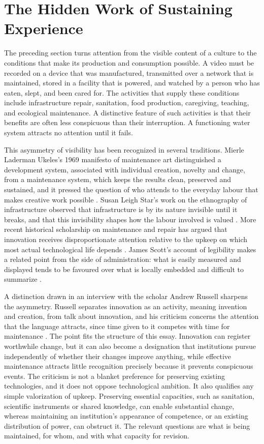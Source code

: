 \documentclass[11pt]{article}
\theoremstyle{definition}
\theoremstyle{remark}
\begin{document}
\section{The Hidden Work of Sustaining Experience}

The preceding section turns attention from the visible content of a culture to the conditions that make its production and consumption possible. A video must be recorded on a device that was manufactured, transmitted over a network that is maintained, stored in a facility that is powered, and watched by a person who has eaten, slept, and been cared for. The activities that supply these conditions include infrastructure repair, sanitation, food production, caregiving, teaching, and ecological maintenance. A distinctive feature of such activities is that their benefits are often less conspicuous than their interruption. A functioning water system attracts no attention until it fails.

This asymmetry of visibility has been recognized in several traditions. Mierle Laderman Ukeles's 1969 manifesto of maintenance art distinguished a development system, associated with individual creation, novelty and change, from a maintenance system, which keeps the results clean, preserved and sustained, and it pressed the question of who attends to the everyday labour that makes creative work possible \cite{ukeles1969}. Susan Leigh Star's work on the ethnography of infrastructure observed that infrastructure is by its nature invisible until it breaks, and that this invisibility shapes how the labour involved is valued \cite{star1999}. More recent historical scholarship on maintenance and repair has argued that innovation receives disproportionate attention relative to the upkeep on which most actual technological life depends \cite{russell2018}. James Scott's account of legibility makes a related point from the side of administration: what is easily measured and displayed tends to be favoured over what is locally embedded and difficult to summarize \cite{scott1998}.

A distinction drawn in an interview with the scholar Andrew Russell sharpens the asymmetry. Russell separates innovation as an activity, meaning invention and creation, from talk about innovation, and his criticism concerns the attention that the language attracts, since time given to it competes with time for maintenance \cite{russell2017}. The point fits the structure of this essay. Innovation can register worthwhile change, but it can also become a designation that institutions pursue independently of whether their changes improve anything, while effective maintenance attracts little recognition precisely because it prevents conspicuous events. The criticism is not a blanket preference for preserving existing technologies, and it does not oppose technological ambition. It also qualifies any simple valorization of upkeep. Preserving essential capacities, such as sanitation, scientific instruments or shared knowledge, can enable substantial change, whereas maintaining an institution's appearance of competence, or an existing distribution of power, can obstruct it. The relevant questions are what is being maintained, for whom, and with what capacity for revision.
\end{document}
